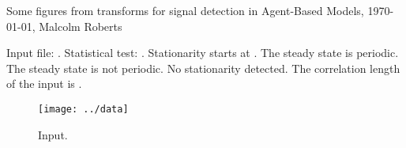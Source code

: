 \documentclass[a4paper]{article}
\newcommand{\thetitle}{Some figures from transforms for signal
  detection in Agent-Based Models}
\newcommand{\theauthor}{Malcolm Roberts}
\begin{document}
\begin{center}
  \thetitle{}, \today, \theauthor{}
\end{center}



%
%





           {}
           {}



           {}
           {}

Input file: \texttt{\filename}. %
Statistical test: \smethod. %
%
       {Stationarity starts at \startval{}.%
       {The steady state is periodic.}%
       {The steady state is not periodic.}
}%
       {No stationarity detected.} 
The correlation length of the input is \corrlen{}.

\begin{figure}[htbp]
  \begin{center}        
    \texttt{[image: ../data]}
    \caption{Input.}
  \end{center}
\end{figure}
\end{document}
